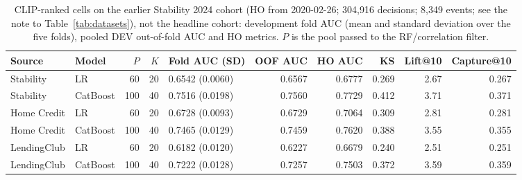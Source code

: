 \documentclass[final,5p,twocolumn]{elsarticle}
\newcommand{\Kfeat}{K}
\begin{document}
\begin{table}[htbp]
\centering
\footnotesize
\begin{threeparttable}
\caption{CLIP-ranked cells on the earlier Stability 2024 cohort (HO from 2020-02-26; 304,916 decisions; 8,349 events; see the note to Table~\ref{tab:datasets}), not the headline cohort: development fold AUC (mean and standard deviation over the five folds), pooled DEV out-of-fold AUC and HO metrics. $P$ is the pool passed to the RF/correlation filter.}
\label{tab:clip_cells}
\begin{tabular}{@{}llrrlrrrrr@{}}
\toprule
Source & Model & $P$ & $\Kfeat$ & Fold AUC (SD) & OOF AUC & HO AUC & KS & Lift@10 & Capture@10 \\
\midrule
Stability & LR & 60 & 20 & 0.6542 (0.0060) & 0.6567 & 0.6777 & 0.269 & 2.67 & 0.267 \\
Stability & CatBoost & 100 & 40 & 0.7516 (0.0198) & 0.7560 & 0.7729 & 0.412 & 3.71 & 0.371 \\
Home Credit & LR & 60 & 20 & 0.6728 (0.0093) & 0.6729 & 0.7064 & 0.309 & 2.81 & 0.281 \\
Home Credit & CatBoost & 100 & 40 & 0.7465 (0.0129) & 0.7459 & 0.7620 & 0.388 & 3.55 & 0.355 \\
LendingClub & LR & 60 & 20 & 0.6182 (0.0120) & 0.6227 & 0.6679 & 0.240 & 2.51 & 0.251 \\
LendingClub & CatBoost & 100 & 40 & 0.7222 (0.0128) & 0.7257 & 0.7503 & 0.372 & 3.59 & 0.359 \\
\bottomrule
\end{tabular}
\end{threeparttable}
\end{table}
\end{document}
